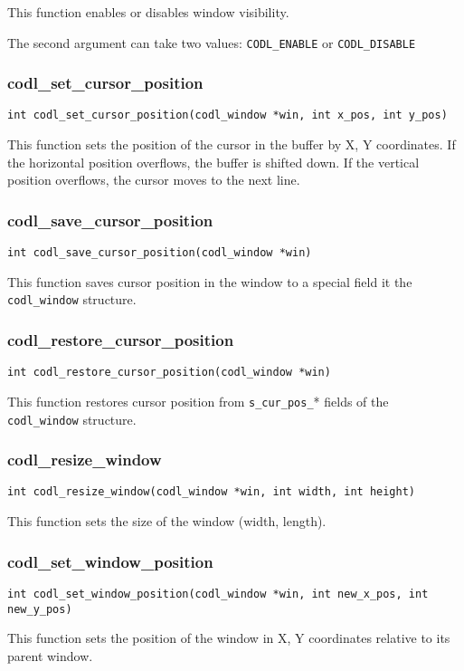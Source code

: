 \documentclass{article}
\newcommand{\fstep}{\vspace{3mm}\noindent}
\begin{document}
\fstep{} This function enables or disables window visibility.

The second argument can take two values: {\tt CODL\_ENABLE} or {\tt CODL\_DISABLE}

\subsubsection{codl\_set\_cursor\_position}
{\tt int codl\_set\_cursor\_position(codl\_window *win, int x\_pos, int y\_pos)}

\fstep{} This function sets the position of the cursor in the buffer by X, Y coordinates.
If the horizontal position overflows, the buffer is shifted down.
If the vertical position overflows, the cursor moves to the next line.

\subsubsection{codl\_save\_cursor\_position}
{\tt int codl\_save\_cursor\_position(codl\_window *win)}

\fstep{} This function saves cursor position in the window to a special field
it the {\tt codl\_window} structure.

\subsubsection{codl\_restore\_cursor\_position}
{\tt int codl\_restore\_cursor\_position(codl\_window *win)}

\fstep{} This function restores cursor position from {\tt s\_cur\_pos\_}* fields
of the {\tt codl\_window} structure.

\subsubsection{codl\_resize\_window}
{\tt int codl\_resize\_window(codl\_window *win, int width, int height)}

\fstep{} This function sets the size of the window (width, length).

\subsubsection{codl\_set\_window\_position}
{\tt int codl\_set\_window\_position(codl\_window *win, int new\_x\_pos, int new\_y\_pos)}

\fstep{} This function sets the position of the window in X, Y
coordinates relative to its parent window.
\end{document}
